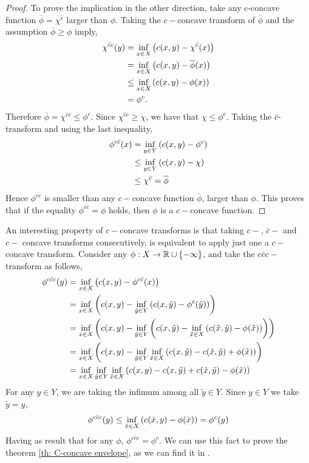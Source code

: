 \begin{proof}
	To prove the implication in the other direction, take any c-concave function $\overline \phi =\chi^{\bar c}$ larger than $\phi$. Taking the $c-$concave transform of $\overline \phi$ and the assumption $\overline \phi \geq \phi$ imply,
	\begin{align*}
		\chi^{\bar c c}(y)&=\inf_{x\in X}\left( c(x,y)-\chi^{\bar c}(x) \right)\\
		&=\inf_{x\in X}\left( c(x,y)-\overline \phi(x) \right)\\
		&\leq \inf_{x\in X}\left( c(x,y)-\phi(x) \right)\\
		&=\phi^{c}.
	\end{align*}
	Therefore $\overline \phi =\chi^{\bar c c} \leq \phi^c$. Since $\chi^{\bar c c}\geq \chi$, we have that $\chi\leq \phi^c$. 
	Taking the $\bar c$-transform and using the last inequality,
	\begin{align*}
		\phi^{c\bar c}(x)&=\inf_{y\in Y} \left( c(x,y)-\phi^c \right)\\ 
		&\leq \inf_{y\in Y} \left( c(x,y)-\chi \right)\\
		&\leq \chi^{\bar c}=\overline \phi
	\end{align*}
	Hence $\phi^{c\bar  c}$ is smaller than any $c-$concave function $\overline \phi$, larger than $\phi$. This proves that if the equality $\phi^{c\bar c}=\phi$ holds, then $\phi$ is a $c-$concave function.  
\end{proof}

An interesting property of $c-$concave transforms is that taking $c-$, $\bar c -$ and $c-$ concave transforms consecutively, is equivalent to apply just one a $c-$concave transform. Consider any $\phi:X\rightarrow \mathbb{R}\cup\left\lbrace -\infty \right\rbrace$, and take the $c\bar c c-$transform as follows,
	\begin{align*}
	\phi^{c\bar cc}(y)&=\inf_{x\in X}\left( c(x,y)-\phi^{c\bar c }(x) \right) \\
	&=\inf_{x\in X}\left( c(x,y)-\inf_{\tilde y \in Y}\left( c(x, \tilde y)-\phi^{c}(\tilde y) \right) \right)\\
	&=\inf_{x\in X}\left( c(x,y)-\inf_{\tilde y \in Y}\left( c(x, \tilde y)-\inf_{\tilde x \in X}\left( c(\tilde x, \tilde y)-\phi(\tilde x) \right) \right) \right) \\
	&=\inf_{x\in X}\left( c(x,y)-\inf_{\tilde y \in Y}\inf_{\tilde x \in X}\left( c(x, \tilde y)-c(\tilde x, \tilde y)+\phi(\tilde x) \right) \right)\\
	&=\inf_{x\in X}\inf_{\tilde y \in Y}\inf_{\tilde x \in X}\left( c(x,y)-c(x, \tilde y)+c(\tilde x, \tilde y)-\phi(\tilde x) \right)
	\end{align*}
	For any $y\in Y$, we are taking the infimum among all $\tilde y \in Y$. Since $y\in Y$ we take $\tilde y = y$,  
	\begin{equation*}
	\phi^{c\bar cc}(y)\leq \inf_{\tilde x \in X}\left( c(\tilde x, y)-\phi(\tilde x) \right)=\phi^{c}(y)  
	\end{equation*} 
	Having as result that for any $\phi$, $\phi^{c\bar c c}=\phi^c$. We can use this fact to prove the theorem \ref{th: C-concave envelope}, as we can find it in \cite{Villani2008}. 

